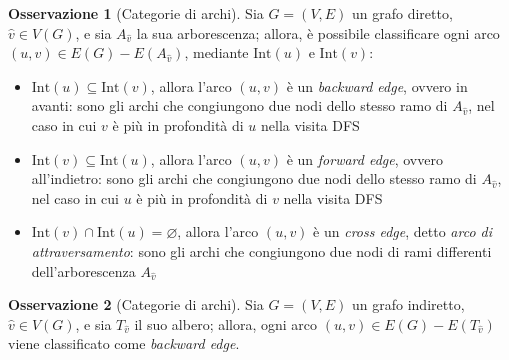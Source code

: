 \documentclass[14pt]{extreport}
\theoremstyle{definition}
\theoremstyle{definition}
\newtheorem{remark}{Osservazione}[subsection]
\begin{document}
\begin{remark}[Categorie di archi]
    Sia $G= (V, E)$ un grafo diretto, $\hat v \in V(G)$, e sia $A_{\hat v}$ la sua arborescenza; allora, è possibile classificare ogni arco $(u, v) \in E(G) - E(A_{\hat v})$, mediante $\mathrm{Int}(u)$ e $\mathrm{Int}(v)$:
    \begin{itemize}
        \item $\mathrm{Int}(u) \subseteq \mathrm{Int}(v)$, allora l'arco $(u, v)$ è un \textit{backward edge}, ovvero in avanti: sono gli archi che congiungono due nodi dello stesso ramo di $A_{\hat v}$, nel caso in cui $v$ è più in profondità di $u$ nella visita DFS 
        \item $\mathrm{Int}(v) \subseteq \mathrm{Int}(u)$, allora l'arco $(u, v)$ è un \textit{forward edge}, ovvero all'indietro: sono gli archi che congiungono due nodi dello stesso ramo di $A_{\hat v}$, nel caso in cui $u$ è più in profondità di $v$ nella visita DFS
        \item $\mathrm{Int}(v) \cap \mathrm{Int}(u) = \varnothing$, allora l'arco $(u, v)$ è un \textit{cross edge}, detto \textit{arco di attraversamento}: sono gli archi che congiungono due nodi di rami differenti dell'arborescenza $A_{\hat v}$
    \end{itemize}
\end{remark}

\begin{remark}[Categorie di archi]
    Sia $G=(V, E)$ un grafo indiretto, $\hat v \in V(G)$, e sia $T_{\hat v}$ il suo albero; allora, ogni arco $(u, v) \in E(G) - E(T_{\hat v})$ viene classificato come \textit{backward edge}.
\end{remark}
\end{document}
